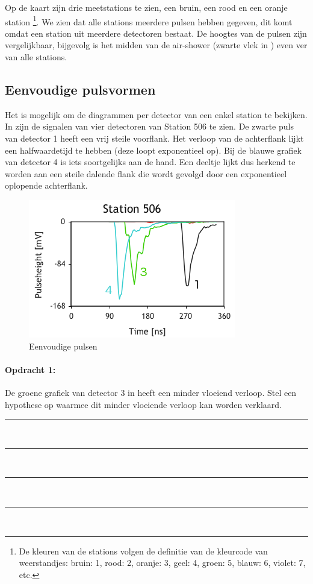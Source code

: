 Op de kaart zijn drie meetstations te zien, een bruin, een rood en een
oranje station%
\footnote{De kleuren van de stations volgen de definitie van de
kleurcode van weerstandjes: bruin: 1, rood: 2, oranje: 3, geel: 4,
groen: 5, blauw: 6, violet: 7, etc. %
}. We zien dat alle stations meerdere pulsen hebben gegeven, dit komt
omdat een station uit meerdere detectoren bestaat. De hoogtes van de
pulsen zijn vergelijkbaar, bijgevolg is het midden van de air-shower
(zwarte vlek in ) even ver van alle stations. 


\subsection{Eenvoudige pulsvormen}

Het is mogelijk om de diagrammen per detector van een enkel station
te bekijken. In  zijn de signalen
van vier detectoren van Station 506 te zien. De zwarte puls van detector
1 heeft een vrij steile voorflank. Het verloop van de achterflank
lijkt een halfwaardetijd te hebben (deze loopt exponentieel op). Bij
de blauwe grafiek van detector 4 is iets soortgelijks aan de hand.
Een deeltje lijkt dus herkend te worden aan een steile dalende flank
die wordt gevolgd door een exponentieel oplopende achterflank.

\begin{figure}[ht]
    \centering
    \includegraphics[scale=0.65]{Figures/Traces506}
    \caption{Eenvoudige pulsen}
    \label{fig:Eenvoudige-pulsen}
\end{figure}


\begin{minipage}[t]{1\columnwidth}%

\paragraph{Opdracht 1:}

De groene grafiek van detector 3 in 
heeft een minder vloeiend verloop. Stel een hypothese op waarmee dit
minder vloeiende verloop kan worden verklaard.

\begin{center}
    \rule{\textwidth}{0.3mm}\\
    \rule{\textwidth}{0.3mm}\\
    \rule{\textwidth}{0.3mm}\\
    \rule{\textwidth}{0.3mm}\\
\end{center}
\end{minipage}

